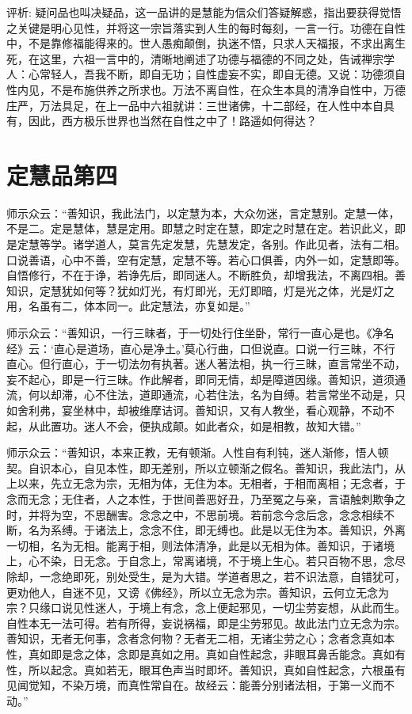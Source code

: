 \documentclass[12pt,twoside,openany]{book}
\newcommand{\kai}[1]{{\CJKfamily{kai}#1}}
\begin{document}
\kai{评析: 疑问品也叫决疑品，这一品讲的是慧能为信众们答疑解惑，指出要获得觉悟之关键是明心见性，并将这一宗旨落实到人生的每时每刻，一言一行。功德在自性中，不是靠修福能得来的。世人愚痴颠倒，执迷不悟，只求人天福报，不求出离生死，在这里，六祖一言中的，清晰地阐述了功德与福德的不同之处，告诫禅宗学人：心常轻人，吾我不断，即自无功；自性虚妄不实，即自无德。又说：功德须自性内见，不是布施供养之所求也。万法不离自性，在众生本具的清净自性中，万德庄严，万法具足，在上一品中六祖就讲：三世诸佛，十二部经，在人性中本自具有，因此，西方极乐世界也当然在自性之中了！路遥如何得达？}

\chapter{定慧品第四}
师示众云：“善知识，我此法门，以定慧为本，大众勿迷，言定慧别。定慧一体，不是二。定是慧体，慧是定用。即慧之时定在慧，即定之时慧在定。若识此义，即是定慧等学。诸学道人，莫言先定发慧，先慧发定，各别。作此见者，法有二相。口说善语，心中不善，空有定慧，定慧不等。若心口俱善，内外一如，定慧即等。自悟修行，不在于诤，若诤先后，即同迷人。不断胜负，却增我法，不离四相。善知识，定慧犹如何等？犹如灯光，有灯即光，无灯即暗，灯是光之体，光是灯之用，名虽有二，体本同一。此定慧法，亦复如是。”

师示众云：“善知识，一行三昧者，于一切处行住坐卧，常行一直心是也。《净名经》云：‘直心是道场，直心是净土。’莫心行曲，口但说直。口说一行三昧，不行直心。但行直心，于一切法勿有执著。迷人著法相，执一行三昧，直言常坐不动，妄不起心，即是一行三昧。作此解者，即同无情，却是障道因缘。善知识，道须通流，何以却滞，心不住法，道即通流，心若住法，名为自缚。若言常坐不动是，只如舍利弗，宴坐林中，却被维摩诘诃。善知识，又有人教坐，看心观静，不动不起，从此置功。迷人不会，便执成颠。如此者众，如是相教，故知大错。”

师示众云：“善知识，本来正教，无有顿渐。人性自有利钝，迷人渐修，悟人顿契。自识本心，自见本性，即无差别，所以立顿渐之假名。善知识，我此法门，从上以来，先立无念为宗，无相为体，无住为本。无相者，于相而离相；无念者，于念而无念；无住者，人之本性，于世间善恶好丑，乃至冤之与亲，言语触刺欺争之时，并将为空，不思酬害。念念之中，不思前境。若前念今念后念，念念相续不断，名为系缚。于诸法上，念念不住，即无缚也。此是以无住为本。善知识，外离一切相，名为无相。能离于相，则法体清净，此是以无相为体。善知识，于诸境上，心不染，日无念。于自念上，常离诸境，不于境上生心。若只百物不思，念尽除却，一念绝即死，别处受生，是为大错。学道者思之，若不识法意，自错犹可，更劝他人，自迷不见，又谤《佛经》，所以立无念为宗。善知识，云何立无念为宗？只缘口说见性迷人，于境上有念，念上便起邪见，一切尘劳妄想，从此而生。自性本无一法可得。若有所得，妄说祸福，即是尘劳邪见。故此法门立无念为宗。善知识，无者无何事，念者念何物？无者无二相，无诸尘劳之心；念者念真如本性，真如即是念之体，念即是真如之用。真如自性起念，非眼耳鼻舌能念。真如有性，所以起念。真如若无，眼耳色声当时即坏。善知识，真如自性起念，六根虽有见闻觉知，不染万境，而真性常自在。故经云：能善分别诸法相，于第一义而不动。”
\end{document}
